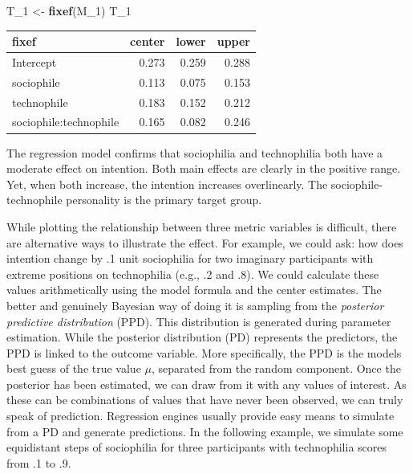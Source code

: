 \documentclass[]{svmono}
\newenvironment{Shaded}{\begin{snugshade}}{\end{snugshade}}
\newcommand{\KeywordTok}[1]{\textcolor[rgb]{0.13,0.29,0.53}{\textbf{#1}}}
\newcommand{\DecValTok}[1]{\textcolor[rgb]{0.00,0.00,0.81}{#1}}
\newcommand{\StringTok}[1]{\textcolor[rgb]{0.31,0.60,0.02}{#1}}
\newcommand{\NormalTok}[1]{#1}
\theoremstyle{definition}
\theoremstyle{definition}
\theoremstyle{definition}
\theoremstyle{remark}
\begin{document}
\begin{Shaded}
\begin{Highlighting}[]
\NormalTok{T_}\DecValTok{1}\NormalTok{ <-}\StringTok{ }\KeywordTok{fixef}\NormalTok{(M_}\DecValTok{1}\NormalTok{)}
\NormalTok{T_}\DecValTok{1}
\end{Highlighting}
\end{Shaded}

\begin{longtable}[]{@{}lrrr@{}}
\toprule
fixef & center & lower & upper\tabularnewline
\midrule
\endhead
Intercept & 0.273 & 0.259 & 0.288\tabularnewline
sociophile & 0.113 & 0.075 & 0.153\tabularnewline
technophile & 0.183 & 0.152 & 0.212\tabularnewline
sociophile:technophile & 0.165 & 0.082 & 0.246\tabularnewline
\bottomrule
\end{longtable}

The regression model confirms that sociophilia and technophilia both
have a moderate effect on intention. Both main effects are clearly in
the positive range. Yet, when both increase, the intention increases
overlinearly. The sociophile-technophile personality is the primary
target group.

While plotting the relationship between three metric variables is
difficult, there are alternative ways to illustrate the effect. For
example, we could ask: how does intention change by .1 unit sociophilia
for two imaginary participants with extreme positions on technophilia
(e.g., .2 and .8). We could calculate these values arithmetically using
the model formula and the center estimates. The better and genuinely
Bayesian way of doing it is sampling from the \emph{posterior predictive
distribution} (PPD). This distribution is generated during parameter
estimation. While the posterior distribution (PD) represents the
predictors, the PPD is linked to the outcome variable. More
specifically, the PPD is the models best guess of the true value
\(\mu\), separated from the random component. Once the posterior has
been estimated, we can draw from it with any values of interest. As
these can be combinations of values that have never been observed, we
can truly speak of prediction. Regression engines usually provide easy
means to simulate from a PD and generate predictions. In the following
example, we simulate some equidistant steps of sociophilia for three
participants with technophilia scores from .1 to .9.
\end{document}
